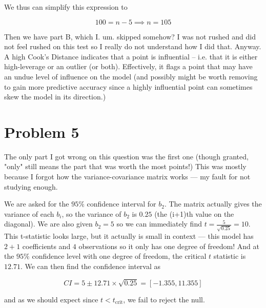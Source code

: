 \documentclass[12pt, letterpaper]{article}
\begin{document}
    We thus can simplify this expression to 

    \[ 100 = n - 5 \implies n = 105     \]

    Then we have part B, which I. um. skipped somehow? I was not rushed and did not feel rushed on this test so I really do not understand how I did that. Anyway. A high Cook's Distance indicates that a point is influential -- i.e. that it is either high-leverage or an outlier (or both). Effectively, it flags a point that may have an undue level of influence on the model (and possibly might be worth removing to gain more predictive accuracy since a highly influential point can sometimes skew the model in its direction.)

    \section{Problem 5}

    The only part I got wrong on this question was the first one (though granted, "only" still means the part that was worth the most points!) This was mostly because I forgot how the variance-covariance matrix works --- my fault for not studying enough. 

    We are asked for the \(95\%\) confidence interval for \(b_2\). The matrix actually gives the variance of each \(b_i\), so the variance of \(b_2\) is \(0.25\) (the (i+1)th value on the diagonal). We are also given \(b_2 = 5\) so we can immediately find \(t = \frac{5}{\sqrt{0.25}} = 10\). This t-statistic looks large, but it actually is small in context --- this model has \(2+1\) coefficients and \(4\) observations so it only has one degree of freedom! And at the \(95\%\) confidence level with one degree of freedom, the critical \(t\) statistic is \(12.71\). We can then find the confidence interval as

    \[ CI = 5 \pm 12.71 \times \sqrt{0.25} = [ -1.355, 11.355 ]      \]

    and as we should expect since \(t < t_{\text{crit}}\), we fail to reject the null.

    
\end{document}
